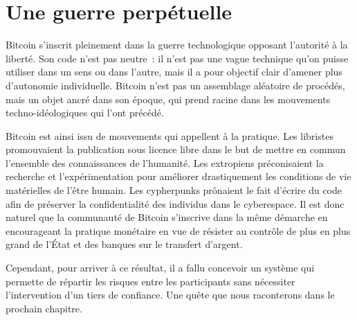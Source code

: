 
\section*{Une guerre perpétuelle}

Bitcoin s'inscrit pleinement dans la guerre technologique opposant l'autorité à la liberté. Son code n'est pas neutre~: il n'est pas une vague technique qu'on puisse utiliser dans un sens ou dans l'autre, mais il a pour objectif clair d'amener plus d'autonomie individuelle. Bitcoin n'est pas un assemblage aléatoire de procédés, mais un objet ancré dans son époque, qui prend racine dans les mouvements techno-idéologiques qui l'ont précédé.

Bitcoin est ainsi issu de mouvements qui appellent à la pratique. Les libristes promouvaient la publication sous licence libre dans le but de mettre en commun l'ensemble des connaissances de l'humanité. Les extropiens préconisaient la recherche et l'expérimentation pour améliorer drastiquement les conditions de vie matérielles de l'être humain. Les cypherpunks prônaient le fait d'écrire du code afin de préserver la confidentialité des individus dans le cyberespace. Il est donc naturel que la communauté de Bitcoin s'inscrive dans la même démarche en encourageant la pratique monétaire en vue de résister au contrôle de plus en plus grand de l'État et des banques sur le transfert d'argent.

Cependant, pour arriver à ce résultat, il a fallu concevoir un système qui permette de répartir les risques entre les participants sans nécessiter l'intervention d'un tiers de confiance. Une quête que nous raconterons dans le prochain chapitre.
